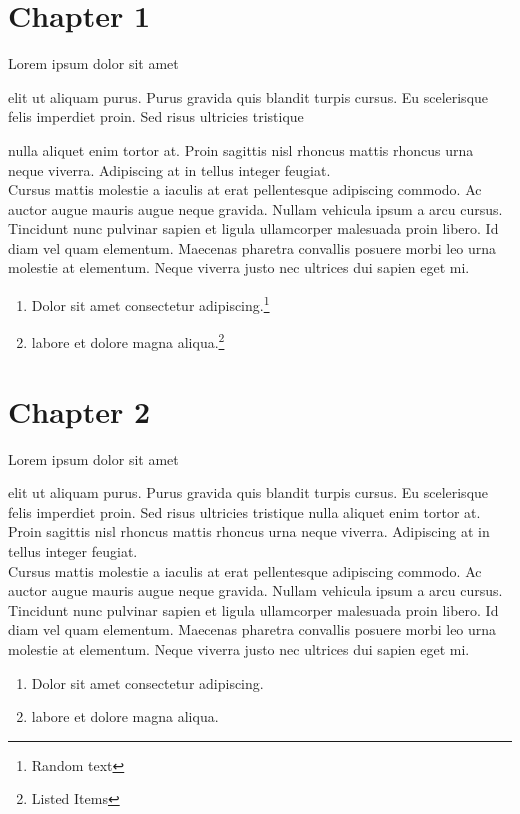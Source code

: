 \documentclass[12pt]{report}
\begin{document}
\chapter*{Chapter 1}

\begin{minipage}[t]{20.0cm}
\begin{flushright}
    Lorem ipsum dolor sit amet\\
\end{flushright}

elit ut aliquam purus. Purus gravida quis blandit turpis cursus. Eu scelerisque felis imperdiet proin. Sed risus ultricies tristique

nulla aliquet enim tortor at. Proin sagittis nisl rhoncus mattis rhoncus urna neque viverra. Adipiscing at in tellus integer feugiat.\\[3mm]
\noindent {} Cursus mattis molestie a iaculis at erat pellentesque adipiscing
commodo. Ac auctor augue mauris augue neque gravida. Nullam vehicula ipsum a arcu cursus. Tincidunt nunc pulvinar sapien et
ligula ullamcorper malesuada proin libero. Id diam vel quam elementum. Maecenas pharetra convallis posuere morbi leo urna molestie
at elementum. Neque viverra justo nec ultrices dui sapien eget mi.\\
\begin{enumerate}
    \item{Dolor sit amet consectetur adipiscing.}\footnote{Random text}
    \item{labore et dolore magna aliqua.}\footnote{Listed Items}
\end{enumerate}
\end{minipage}

\chapter*{Chapter 2}
\begin{flushright}
    Lorem ipsum dolor sit amet\\
\end{flushright}

elit ut aliquam purus. Purus gravida quis blandit turpis cursus. Eu scelerisque felis imperdiet proin. Sed risus ultricies tristique
nulla aliquet enim tortor at. Proin sagittis nisl rhoncus mattis rhoncus urna neque viverra. Adipiscing at in tellus integer feugiat.\\[3mm]
\noindent {} Cursus mattis molestie a iaculis at erat pellentesque adipiscing
commodo. Ac auctor augue mauris augue neque gravida. Nullam vehicula ipsum a arcu cursus. Tincidunt nunc pulvinar sapien et
ligula ullamcorper malesuada proin libero. Id diam vel quam elementum. Maecenas pharetra convallis posuere morbi leo urna molestie
at elementum. Neque viverra justo nec ultrices dui sapien eget mi.\\
\begin{enumerate}
    \item{Dolor sit amet consectetur adipiscing.}
    \item{labore et dolore magna aliqua.}
\end{enumerate}
\end{document}
